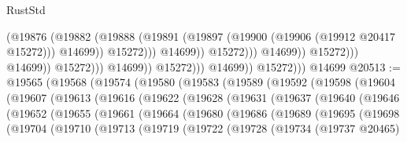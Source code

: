 \begin{lexlean}{RustStd}
\begin{coremodule}
                                                      (@19876
                                                        (@19882
                                                          (@19888
                                                            (@19891
                                                              (@19897
                                                                (@19900
                                                                  (@19906 (@19912 @20417 @15272)))
                                                                @14699))
                                                            @15272)))
                                                      @14699))
                                                  @15272)))
                                            @14699))
                                        @15272)))
                                  @14699))
                              @15272)))
                        @14699))
                    @15272)))
              @14699))
          @15272)))
    @14699
@20513 := @19565
    (@19568
      (@19574
        (@19580
          (@19583
            (@19589
              (@19592
                (@19598
                  (@19604
                    (@19607
                      (@19613
                        (@19616
                          (@19622
                            (@19628
                              (@19631
                                (@19637
                                  (@19640
                                    (@19646
                                      (@19652
                                        (@19655
                                          (@19661
                                            (@19664
                                              (@19680
                                                (@19686
                                                  (@19689
                                                    (@19695
                                                      (@19698
                                                        (@19704
                                                          (@19710
                                                            (@19713
                                                              (@19719
                                                                (@19722
                                                                  (@19728
                                                                    (@19734
                                                                      (@19737 @20465)

\end{coremodule}
\end{lexlean}
